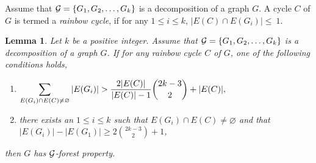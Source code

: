 \documentclass[11pt]{article}
\newtheorem{prelem}{{\bf Lemma}}
\newenvironment{lem}{\begin{prelem}{\hspace{-0.5
               em}{\bf.\ }}}{\end{prelem}}
\begin{document}
Assume that ${\cal G}=\{G_1,G_2,\ldots,G_k\}$ is a decomposition of a graph $G$. A cycle $C$ of $G$ is termed a {\it rainbow cycle}, if for any $1\leq i\leq k$, $|E(C)\cap E(G_i)|\leq~1$.
\begin{lem}\label{forestsubgraph}
Let $k$ be a positive integer. 
Assume that ${\cal G}=\{G_1,G_2,\ldots,G_k\}$ is a 
decomposition of a graph $G$. If for any rainbow cycle $C$ of $G$, one of the following conditions holds,  
\begin{enumerate}
\item[{\rm a)}] $\displaystyle\sum_{E(G_i)\cap E(C)\neq \varnothing}|E(G_i)|>  {2|E(C)|\over |E(C)|-1}\displaystyle
{2k-3\choose 2}+|E(C)|,$
\item[{\rm b)}] there exists an $1\leq i\leq k$ such that $E(G_i)\cap E(C)\not =\varnothing$ and that 
$|E(G_i)|-|E(G_1)|\geq  2\displaystyle {2k-3\choose 2}+1$, 
\end{enumerate}
then $G$ has ${\cal G}$-forest property. 
\end{lem}
\end{document}
